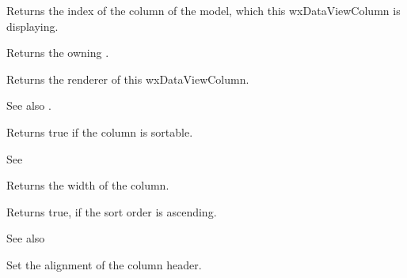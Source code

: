 \label{wxdataviewcolumngetmodelcolumn}


Returns the index of the column of the model, which this
wxDataViewColumn is displaying.

\label{wxdataviewcolumngetowner}


Returns the owning .

\label{wxdataviewcolumngetrenderer}


Returns the renderer of this wxDataViewColumn.

See also .

\label{wxdataviewcolumngetsortable}


Returns true if the column is sortable.

See 

\label{wxdataviewcolumngetwidth}


Returns the width of the column.

\label{wxdataviewcolumnissortorderascending}


Returns true, if the sort order is ascending.

See also 

\label{wxdataviewcolumnsetalignment}


Set the alignment of the column header.

\label{wxdataviewcolumnsetbitmap}


